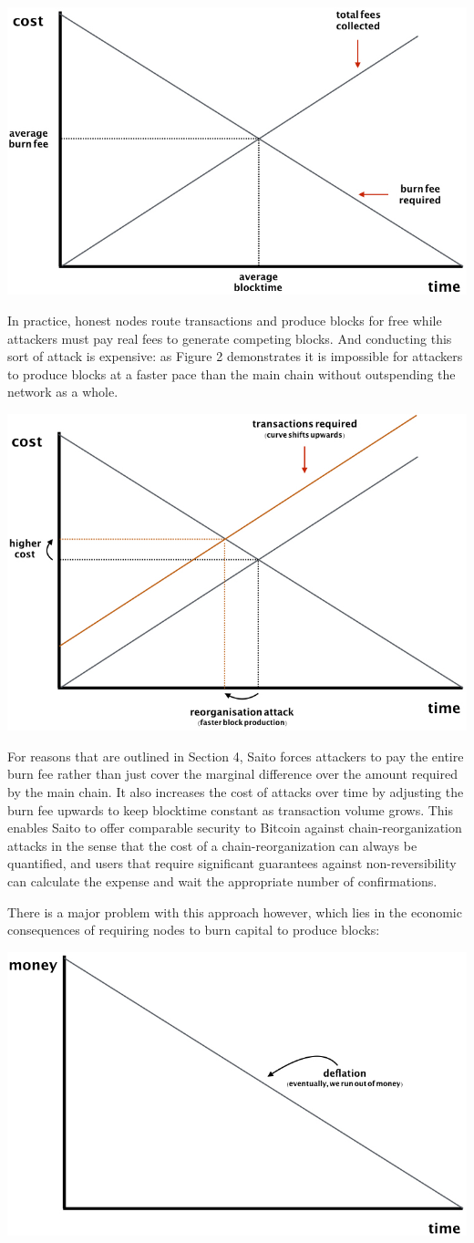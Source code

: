 \documentclass[11.5pt, oneside]{article}   	%
\begin{document}
\begin{multicols}{2}
\includegraphics[width=.45\textwidth]{saito2.jpeg}

In practice, honest nodes route transactions and produce blocks for free while attackers must pay real fees to generate competing blocks. And conducting this sort of attack is expensive: as Figure 2 demonstrates it is impossible for attackers to produce blocks at a faster pace than the main chain without outspending the network as a whole.

\includegraphics[width=.45\textwidth]{saito3.jpeg}

For reasons that are outlined in Section 4, Saito forces attackers to pay the entire burn fee rather than just cover the marginal difference over the amount required by the main chain. It also increases the cost of attacks over time by adjusting the burn fee upwards to keep blocktime constant as transaction volume grows. This enables Saito to offer comparable security to Bitcoin against chain-reorganization attacks in the sense that the cost of a chain-reorganization can always be quantified, and users that require significant guarantees against non-reversibility can calculate the expense and wait the appropriate number of confirmations.

There is a major problem with this approach however, which lies in the economic consequences of requiring nodes to burn capital to produce blocks:

\includegraphics[width=.45\textwidth]{saito4.jpeg}


\end{multicols}
\end{document}

